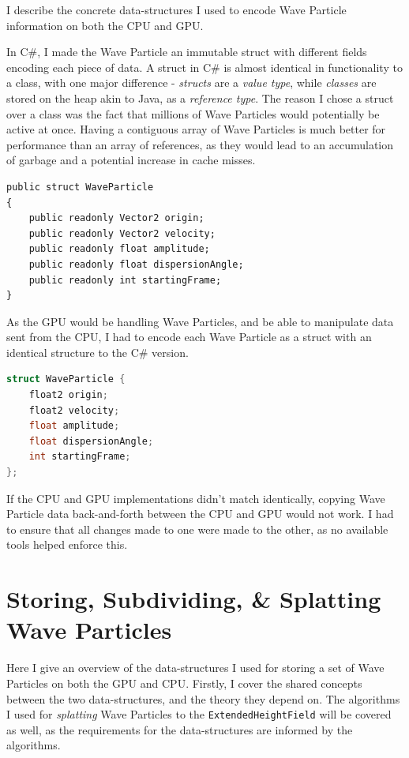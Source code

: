\documentclass[12pt,a4paper,twoside]{report}
\begin{document}

I describe the concrete data-structures I used to encode Wave Particle
information on both the CPU and GPU.

In C\#, I made the Wave Particle an immutable struct with different fields
encoding each piece of data. A struct in C\# is almost identical in
functionality to a class, with one major difference - \textit{structs} are a
\textit{value type}, while \textit{classes} are stored on the heap akin to
Java, as a \textit{reference type}. The reason I chose a struct over a class
was the fact that millions of Wave Particles would potentially be active at
once. Having a contiguous array of Wave Particles is much better for
performance than an array of references, as they would lead to an accumulation
of garbage and a potential increase in cache misses.

\begin{lstlisting}[language={[Sharp]C}]
public struct WaveParticle
{
    public readonly Vector2 origin;
    public readonly Vector2 velocity;
    public readonly float amplitude;
    public readonly float dispersionAngle;
    public readonly int startingFrame;
}
\end{lstlisting}

As the GPU would be handling Wave Particles, and be able to manipulate data sent
from the CPU, I had to encode each Wave Particle as a struct with an identical
structure to the C\# version.

\begin{lstlisting}[language={C}]
struct WaveParticle {
	float2 origin;
	float2 velocity;
	float amplitude;
	float dispersionAngle;
	int startingFrame;
};
\end{lstlisting}

If the CPU and GPU implementations didn't match identically, copying Wave
Particle data back-and-forth between the CPU and GPU would not work. I had to
ensure that all changes made to one were made to the other, as no available
tools helped enforce this.

\section{Storing, Subdividing, \& Splatting Wave Particles}
\label{sec:storing_subdividing_splatting}

Here I give an overview of the data-structures I used for
storing a set of Wave Particles on both the GPU and CPU. Firstly, I cover
the shared concepts between the two data-structures, and the theory they depend
on. The algorithms I used for \textit{splatting} Wave Particles to the
\texttt{ExtendedHeightField} will be covered as well, as the requirements for
the data-structures are informed by the algorithms.
\end{document}
